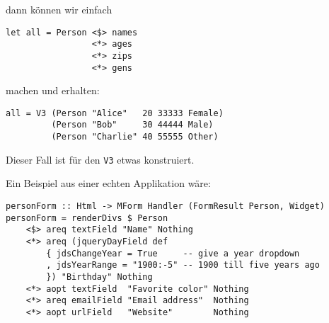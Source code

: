 \documentclass{beamer}
\begin{document}
\begin{frame}[fragile]
dann können wir einfach
\begin{verbatim}
let all = Person <$> names
                 <*> ages
                 <*> zips
                 <*> gens
\end{verbatim}
machen \pause und erhalten:
\begin{verbatim}
all = V3 (Person "Alice"   20 33333 Female)
         (Person "Bob"     30 44444 Male)
         (Person "Charlie" 40 55555 Other)
\end{verbatim}

\end{frame}


\begin{frame}[fragile]
Dieser Fall ist für den \texttt{V3} etwas konstruiert.\\\par
\pause
Ein Beispiel aus einer echten Applikation wäre:
\begin{verbatim}
personForm :: Html -> MForm Handler (FormResult Person, Widget)
personForm = renderDivs $ Person
    <$> areq textField "Name" Nothing
    <*> areq (jqueryDayField def
        { jdsChangeYear = True     -- give a year dropdown
        , jdsYearRange = "1900:-5" -- 1900 till five years ago
        }) "Birthday" Nothing
    <*> aopt textField  "Favorite color" Nothing
    <*> areq emailField "Email address"  Nothing
    <*> aopt urlField   "Website"        Nothing
\end{verbatim}
\end{frame}
\end{document}
